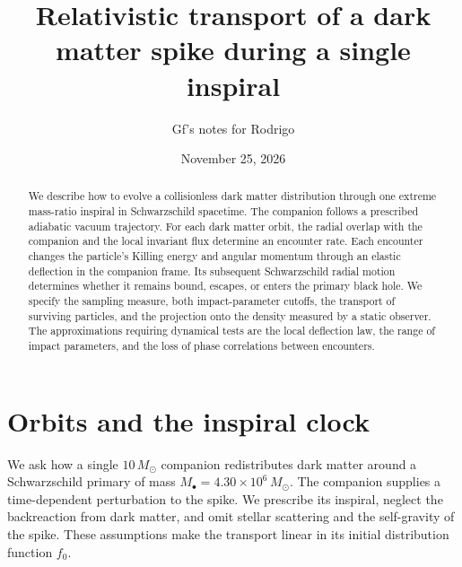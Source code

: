 \documentclass[aps,prd,reprint,amsmath,amssymb,nofootinbib]{revtex4-2}
\begin{document}
\title{Relativistic transport of a dark matter spike during a single inspiral}
\author{Gf's notes for Rodrigo}\noaffiliation
\date{November 25, 2026}
\begin{abstract}
We describe how to evolve a collisionless dark matter distribution through one extreme mass-ratio inspiral in Schwarzschild spacetime. The companion follows a prescribed adiabatic vacuum trajectory. For each dark matter orbit, the radial overlap with the companion and the local invariant flux determine an encounter rate. Each encounter changes the particle's Killing energy and angular momentum through an elastic deflection in the companion frame. Its subsequent Schwarzschild radial motion determines whether it remains bound, escapes, or enters the primary black hole. We specify the sampling measure, both impact-parameter cutoffs, the transport of surviving particles, and the projection onto the density measured by a static observer. The approximations requiring dynamical tests are the local deflection law, the range of impact parameters, and the loss of phase correlations between encounters.
\end{abstract}
\maketitle

\section{Orbits and the inspiral clock}
We ask how a single $10\,M_\odot$ companion redistributes dark matter around a Schwarzschild primary of mass $M_\bullet=4.30\times10^6\,M_\odot$. The companion supplies a time-dependent perturbation to the spike. We prescribe its inspiral, neglect the backreaction from dark matter, and omit stellar scattering and the self-gravity of the spike. These assumptions make the transport linear in its initial distribution function $f_0$.
\end{document}
